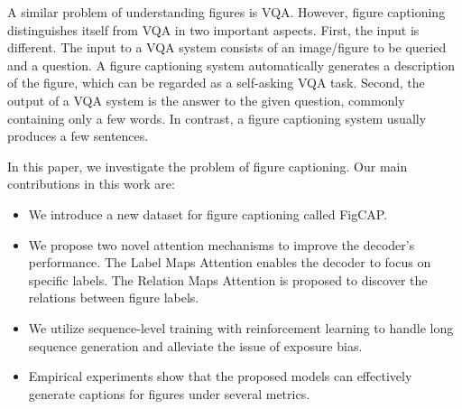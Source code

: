\documentclass[11pt,a4paper]{article}
\begin{document}
A similar problem of understanding figures is 
VQA. However, figure captioning distinguishes itself from VQA in two important aspects. First, the input is different. The input to a VQA system consists of an image/figure to be queried and a question. A figure captioning system automatically generates a description of the figure, which can be regarded as a self-asking VQA task. Second, the output of a VQA system is the answer to the given question, commonly containing only a few words. In contrast, a figure captioning system usually produces a few sentences. %

In this paper, we investigate the problem of figure captioning. 
Our main contributions in this work are:
\begin{itemize}
    \item We introduce a new dataset for figure captioning called FigCAP.
    \item We propose two novel attention mechanisms to improve the decoder's performance. The Label Maps Attention enables the decoder to focus on specific labels. The Relation Maps Attention is proposed to discover the relations between figure labels. 
    \item We utilize sequence-level training with reinforcement learning to handle long sequence generation and alleviate the issue of exposure bias.
    \item Empirical experiments show that the proposed models can effectively generate captions for figures under several metrics. 
\end{itemize}




\end{document}
